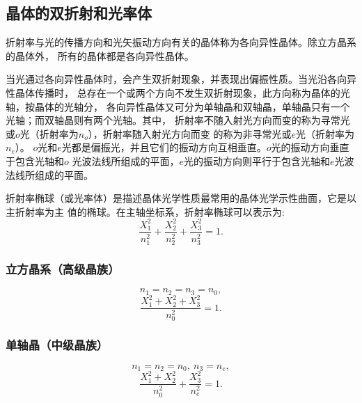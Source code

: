 \documentclass[11pt,a4paper]{article}
\begin{document}
\begin{spacing}{1.3}
\begin{CJK*}{UTF8}{gbsn}
\subsection{晶体的双折射和光率体}
折射率与光的传播方向和光矢振动方向有关的晶体称为各向异性晶体。除立方晶系的晶体外，
所有的晶体都是各向异性晶体。\par
当光通过各向异性晶体时，会产生双折射现象，并表现出偏振性质。当光沿各向异性晶体传播时，
总存在一个或两个方向不发生双折射现象，此方向称为晶体的光轴，按晶体的光轴分，
各向异性晶体又可分为单轴晶和双轴晶，单轴晶只有一个光轴；而双轴晶则有两个光轴。其中，
折射率不随入射光方向而变的称为寻常光或$o$光（折射率为$n_o$），折射率随入射光方向而变
的称为非寻常光或$e$光（折射率为$n_e$）。
$o$光和$e$光都是偏振光，并且它们的振动方向互相垂直。$o$光的振动方向垂直于包含光轴和$o$
光波法线所组成的平面，$e$光的振动方向则平行于包含光轴和$e$光波法线所组成的平面。\par
折射率椭球（或光率体）是描述晶体光学性质最常用的晶体光学示性曲面，它是以主折射率为主
值的椭球。在主轴坐标系，折射率椭球可以表示为:
\begin{equation}
\frac{X_1^2}{n_1^2}+\frac{X_2^2}{n_2^2}+\frac{X_3^2}{n_3^2}=1.\label{4-1-1}
\end{equation} 
\subsubsection{立方晶系（高级晶族）}
\begin{equation}
n_1=n_2=n_3=n_0,
\end{equation}
\begin{equation}
\frac{X^2_1+X^2_2+X^2_3}{n_0^2}=1.
\end{equation}
\subsubsection{单轴晶（中级晶族）}
\begin{equation}
n_1=n_2=n_0,\ n_3=n_e,
\end{equation}
\begin{equation}
\frac{X^2_1+X^2_2}{n_0^2}+\frac{X^2_3}{n_e^2}=1.
\end{equation}


\end{CJK*}
\end{spacing}
\end{document}
